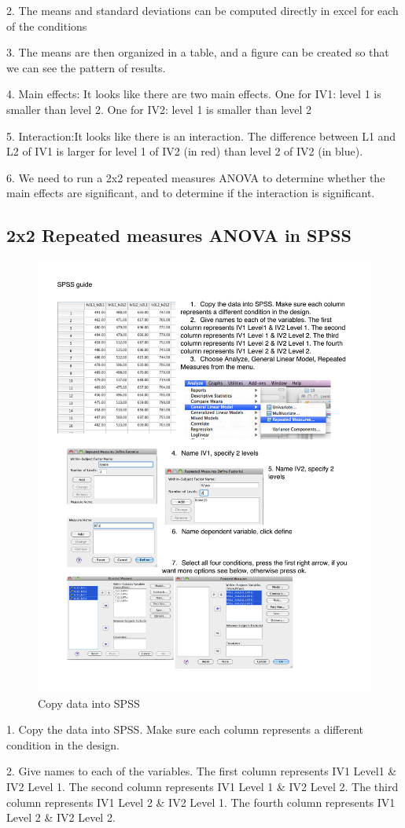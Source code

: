 2. The means and standard deviations can be computed directly in excel for each of the conditions

3. The means are then organized in a table, and a figure can be created so that we can see the pattern of results.

4. Main effects: It looks like there are two main effects. One for IV1: level 1 is smaller than level 2. One for IV2: level 1 is smaller than level 2

5. Interaction:It looks like there is an interaction. The difference between L1 and L2 of IV1 is larger for level 1 of IV2 (in red) than level 2 of IV2 (in blue).

6. We need to run a 2x2 repeated
measures ANOVA to determine whether the main effects are significant, and to determine if the interaction is significant.


\subsection{2x2 Repeated measures ANOVA in SPSS}
 
\begin{figure}
      \includegraphics[width=.6\linewidth]{LabmanualFigures/SPSS6.pdf}
      \caption{Copy data into SPSS}
      \label{fig:SPSS6}
\end{figure}

1. Copy the data into SPSS. Make sure each column represents a different condition in the design.

2. Give names to each of the variables. The first column represents IV1 Level1 \& IV2 Level 1. The second column represents IV1 Level 1 \& IV2 Level 2. The third column represents IV1 Level 2 \& IV2 Level 1. The fourth column represents IV1 Level 2 \& IV2 Level 2.

